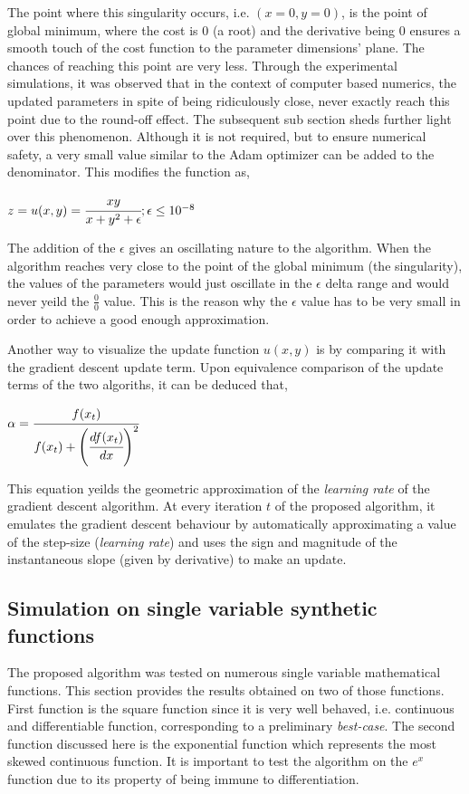 \documentclass{article}
\begin{document}
The point where this singularity occurs, i.e. $(x=0, y=0)$, is the point of global minimum, where the cost is $0$ (a root) and the derivative being $0$ ensures a smooth touch of the cost function to the parameter dimensions' plane. The chances of reaching this point are very less. Through the experimental simulations, it was observed that in the context of computer based numerics, the updated parameters in spite of being ridiculously close, never exactly reach this point due to the round-off effect. The subsequent sub section sheds further light over this phenomenon. Although it is not required, but to ensure numerical safety, a very small value similar to the Adam optimizer can be added to the denominator. This modifies the function as,
\begin{center}
	$z = u(x, y) = \cfrac{xy}{x + y^2 + \epsilon}; \epsilon \leq 10^{-8}$
\end{center}

The addition of the $\epsilon$ gives an oscillating nature to the algorithm. When the algorithm reaches very close to the point of the global minimum (the singularity), the values of the parameters would just oscillate in the $\epsilon$ delta range and would never yeild the $\frac{0}{0}$ value. This is the reason why the $\epsilon$ value has to be very small in order to achieve a good enough approximation.

Another way to visualize the update function $u(x, y)$ is by comparing it with the gradient descent update term. Upon equivalence comparison of the update terms of the two algoriths, it can be deduced that,
\begin{center}
	$\alpha = \cfrac{f(x_t)}{f(x_t) + \left(\cfrac{df(x_t)}{dx}\right)^2}$
\end{center}

This equation yeilds the geometric approximation of the \textit{learning rate} of the gradient descent algorithm. At every iteration $t$ of the proposed algorithm, it emulates the gradient descent behaviour by automatically approximating a value of the step-size (\textit{learning rate}) and uses the sign and magnitude of the instantaneous slope (given by derivative) to make an update.

\subsection{Simulation on single variable synthetic functions}
The proposed algorithm was tested on numerous single variable mathematical functions. This section provides the results obtained on two of those functions. First function is the square function since it is very well behaved, i.e. continuous and differentiable function, corresponding to a preliminary \textit{best-case}. The second function discussed here is the exponential function which represents the most skewed continuous function. It is important to test the algorithm on the $e^x$ function due to its property of being immune to differentiation.
\end{document}
